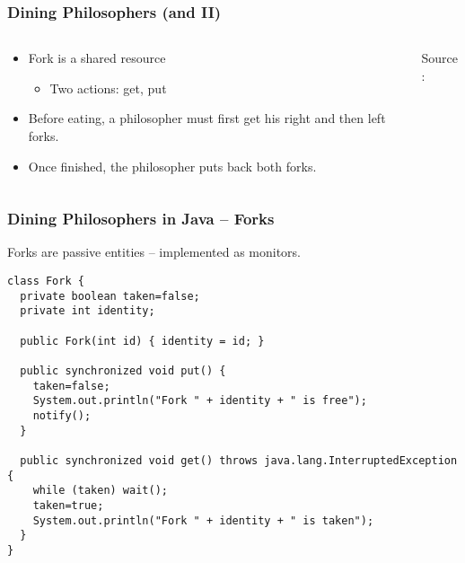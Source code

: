 \begin{frame}
  \frametitle{Dining Philosophers (and II)}

  \begin{columns}
    \begin{column}{.6\textwidth}
       \begin{itemize}
         \item Fork is a \alert{shared resource}
           \begin{itemize}
             \item[] Two actions: \alert{get}, \alert{put}
           \end{itemize}
         \item Before eating, a philosopher must first
           {\only<2-3>{\color{red}\bf}get} his
           {right} and then {left}
            forks.
          \item Once finished, the philosopher {puts back} both forks.
       \end{itemize}
    \end{column}

    \begin{column}{.39\textwidth}
      \hspace*{15pt}\hbox{\tiny Source:}
    \end{column}
  \end{columns}
\end{frame}

\begin{frame}[t, fragile]
  \frametitle{Dining Philosophers in Java -- Forks}

  Forks are passive entities -- implemented as monitors.
  \vspace{.3cm}

  \begin{tcolorbox}[colback=white,colframe=DarkGreen]
  \begin{verbatim}
class Fork {
  private boolean taken=false;
  private int identity;

  public Fork(int id) { identity = id; }

  public synchronized void put() {
    taken=false;
    System.out.println("Fork " + identity + " is free");
    notify();
  }

  public synchronized void get() throws java.lang.InterruptedException {
    while (taken) wait();
    taken=true;
    System.out.println("Fork " + identity + " is taken");
  }
}
  \end{verbatim}
  \end{tcolorbox}
\end{frame}

